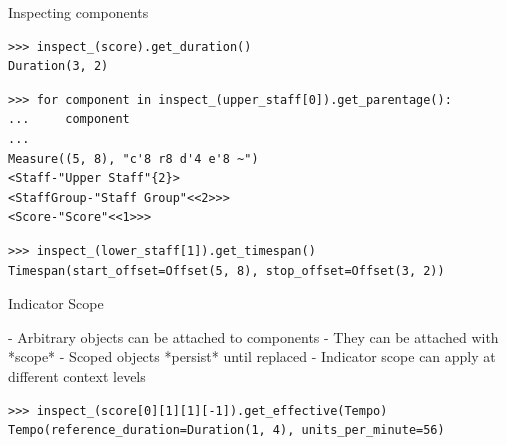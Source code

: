 \begin{frame}[fragile]{Inspecting components}

\begin{abjadbookoutput}
\begin{singlespacing}
\vspace{-0.5\baselineskip}
\begin{verbatim}
>>> inspect_(score).get_duration()
Duration(3, 2)
\end{verbatim}
\begin{verbatim}
>>> for component in inspect_(upper_staff[0]).get_parentage():
...     component
...
Measure((5, 8), "c'8 r8 d'4 e'8 ~")
<Staff-"Upper Staff"{2}>
<StaffGroup-"Staff Group"<<2>>>
<Score-"Score"<<1>>>
\end{verbatim}
\begin{verbatim}
>>> inspect_(lower_staff[1]).get_timespan()
Timespan(start_offset=Offset(5, 8), stop_offset=Offset(3, 2))
\end{verbatim}
\end{singlespacing}
\end{abjadbookoutput}

\end{frame}

\begin{frame}[fragile]{Indicator Scope}
\begin{markdown}
- Arbitrary objects can be attached to components
- They can be attached with *scope*
- Scoped objects *persist* until replaced
- Indicator scope can apply at different context levels
\end{markdown}

\begin{abjadbookoutput}
\begin{singlespacing}
\vspace{-0.5\baselineskip}
\begin{verbatim}
>>> inspect_(score[0][1][1][-1]).get_effective(Tempo)
Tempo(reference_duration=Duration(1, 4), units_per_minute=56)
\end{verbatim}
\end{singlespacing}
\end{abjadbookoutput}

\end{frame}

